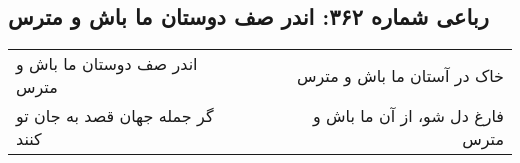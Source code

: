 \begin{center}
\section*{رباعی شماره ۳۶۲: اندر صف دوستان ما باش و مترس}
\label{sec:sh362}
\begin{longtable}{l p{0.5cm} r}
اندر صف دوستان ما باش و مترس
&&
خاک در آستان ما باش و مترس
\\
گر جمله جهان قصد به جان تو کنند
&&
فارغ دل شو، از آن ما باش و مترس
\\
\end{longtable}
\end{center}
